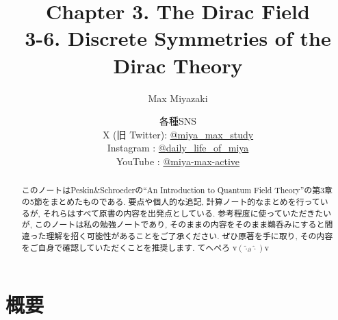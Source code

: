 \documentclass[a4paper,12pt]{article}
\title{Chapter 3. The Dirac Field\\
3-6. Discrete Symmetries of the Dirac Theory}
\date{各種SNS\\
    X (旧 Twitter): \href{https://x.com/miya_max_study}{@miya\_max\_study}\\
    Instagram : \href{https://www.instagram.com/daily_life_of_miya/}{@daily\_life\_of\_miya}\\
    YouTube : \href{https://www.youtube.com/@miya-max-active}{@miya-max-active}
    }
\author{Max Miyazaki}
\begin{document}
\maketitle

\vspace{1cm}
\begin{abstract}
    このノートはPeskin\&Schroederの``An Introduction to Quantum Field Theory''の第3章の5節をまとめたものである. 要点や個人的な追記, 計算ノート的なまとめを行っているが, それらはすべて原書の内容を出発点としている. 参考程度に使っていただきたいが, このノートは私の勉強ノートであり, そのままの内容をそのまま鵜呑みにすると間違った理解を招く可能性があることをご了承ください. ぜひ原著を手に取り, その内容をご自身で確認していただくことを推奨します. てへぺろ v$({\hat{\cdot}_\partial \hat{\cdot}})$v
\end{abstract}


\newpage
\color{blue}
\section*{概要}
\end{document}
